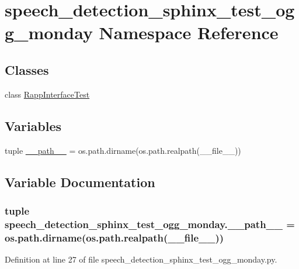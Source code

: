 \hypertarget{namespacespeech__detection__sphinx__test__ogg__monday}{\section{speech\-\_\-detection\-\_\-sphinx\-\_\-test\-\_\-ogg\-\_\-monday Namespace Reference}
\label{namespacespeech__detection__sphinx__test__ogg__monday}
}
\subsection*{Classes}
\begin{DoxyCompactItemize}
\item 
class \hyperlink{classspeech__detection__sphinx__test__ogg__monday_1_1RappInterfaceTest}{Rapp\-Interface\-Test}
\end{DoxyCompactItemize}
\subsection*{Variables}
\begin{DoxyCompactItemize}
\item 
tuple \hyperlink{namespacespeech__detection__sphinx__test__ogg__monday_ac326b0eeec0a94cf530f8f9b9cef54a5}{\-\_\-\-\_\-path\-\_\-\-\_\-} = os.\-path.\-dirname(os.\-path.\-realpath(\-\_\-\-\_\-file\-\_\-\-\_\-))
\end{DoxyCompactItemize}


\subsection{Variable Documentation}
\hypertarget{namespacespeech__detection__sphinx__test__ogg__monday_ac326b0eeec0a94cf530f8f9b9cef54a5}{
\subsubsection[{\-\_\-\-\_\-path\-\_\-\-\_\-}]{\setlength{\rightskip}{0pt plus 5cm}tuple speech\-\_\-detection\-\_\-sphinx\-\_\-test\-\_\-ogg\-\_\-monday.\-\_\-\-\_\-path\-\_\-\-\_\- = os.\-path.\-dirname(os.\-path.\-realpath(\-\_\-\-\_\-file\-\_\-\-\_\-))}}\label{namespacespeech__detection__sphinx__test__ogg__monday_ac326b0eeec0a94cf530f8f9b9cef54a5}


Definition at line 27 of file speech\-\_\-detection\-\_\-sphinx\-\_\-test\-\_\-ogg\-\_\-monday.\-py.


